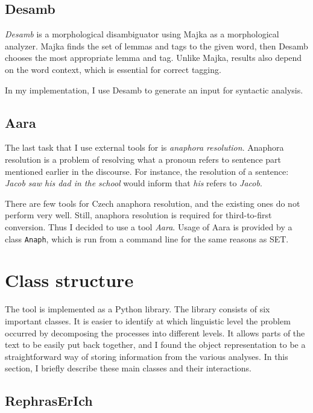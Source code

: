 \subsection{Desamb}

\emph{Desamb} is a morphological disambiguator using Majka as a morphological analyzer. Majka finds the set of lemmas and tags to the given word, then Desamb chooses the most appropriate lemma and tag. Unlike Majka, results also depend on the word context, which is essential for correct tagging.

In my implementation, I use Desamb to generate an input for syntactic analysis.

\subsection{Aara}

The last task that I use external tools for is \emph{anaphora resolution}. Anaphora resolution is a problem of resolving what a pronoun refers to sentence part mentioned earlier in the discourse. For instance, the resolution of a sentence: \emph{Jacob saw his dad in the school} would inform that \emph{his} refers to \emph{Jacob}.

There are few tools for Czech anaphora resolution, and the existing ones do not perform very well. Still, anaphora resolution is required for third-to-first conversion. Thus I decided to use a tool \emph{Aara}. Usage of Aara is provided by a class \texttt{Anaph}, which is run from a command line for the same reasons as SET.

\section{Class structure}

The tool is implemented as a Python library. The library consists of six important classes. It is easier to identify at which linguistic level the problem occurred by decomposing the processes into different levels. It allows parts of the text to be easily put back together, and I found the object representation to be a straightforward way of storing information from the various analyses. In this section, I briefly describe these main classes and their interactions.

\subsection{RephrasErIch}

